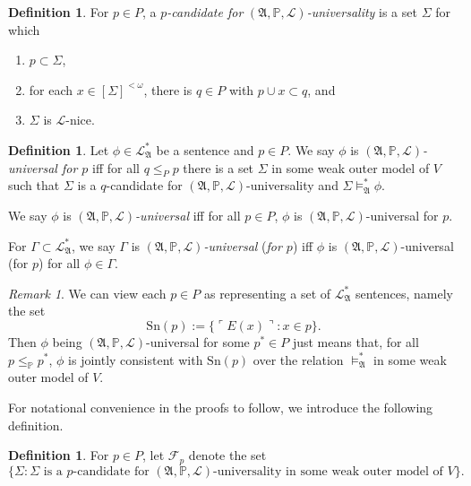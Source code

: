 \documentclass[12pt, twoside]{memoir}
\numberwithin{equation}{section}
\theoremstyle{definition}
\newtheorem{defi}[thm]{Definition}
\theoremstyle{remark}
\newtheorem{rem}[thm]{Remark}
\theoremstyle{definition}
\theoremstyle{definition}
\theoremstyle{definition}
\theoremstyle{remark}
\begin{document}
\begin{defi}
For $p \in P$, a $p$\emph{-candidate for} $(\mathfrak{A}, \mathbb{P}, \mathcal{L})$\emph{-universality} is a set $\Sigma$ for which
\begin{enumerate}[label=(\alph*)]
   \item $p \subset \Sigma$,
   \item for each $x \in [\Sigma]^{<\omega}$, there is $q \in P$ with $p \cup x \subset q$, and 
   \item $\Sigma$ is $\mathcal{L}$-nice.
\end{enumerate}
\end{defi}

\begin{defi}
Let $\phi \in \mathcal{L}^{*}_{\mathfrak{A}}$ be a sentence and $p \in P$. We say $\phi$ is $(\mathfrak{A}, \mathbb{P}, \mathcal{L})$\emph{-universal for $p$} iff for all $q \leq_P p$ there is a set $\Sigma$ in some weak outer model of $V$ such that $\Sigma$ is a $q$-candidate for $(\mathfrak{A}, \mathbb{P}, \mathcal{L})$-universality and $\Sigma \models^*_{\mathfrak{A}} \phi$.

We say $\phi$ is $(\mathfrak{A}, \mathbb{P}, \mathcal{L})$\emph{-universal} iff for all $p \in P$, $\phi$ is $(\mathfrak{A}, \mathbb{P}, \mathcal{L})$-universal for $p$. 

For $\Gamma \subset \mathcal{L}^{*}_{\mathfrak{A}}$, we say $\Gamma$ is $(\mathfrak{A}, \mathbb{P}, \mathcal{L})$\emph{-universal} (\emph{for $p$}) iff $\phi$ is $(\mathfrak{A}, \mathbb{P}, \mathcal{L})$-universal (for $p$) for all $\phi \in \Gamma$.
\end{defi}

\begin{rem}\label{rem341}
We can view each $p \in P$ as representing a set of $\mathcal{L}^{*}_{\mathfrak{A}}$ sentences, namely the set
\begin{equation*}
    \mathrm{Sn}(p) := \{\ulcorner E(x) \urcorner : x \in p\} \text{.}
\end{equation*}
Then $\phi$ being $(\mathfrak{A}, \mathbb{P}, \mathcal{L})$-universal for some $p^* \in P$ just means that, for all $p \leq_{\mathbb{P}} p^*$, $\phi$ is jointly consistent with $\mathrm{Sn}(p)$ over the relation $\models^{*}_{\mathfrak{A}}$ in some weak outer model of $V$.
\end{rem}

For notational convenience in the proofs to follow, we introduce the following definition.

\begin{defi}
For $p \in P$, let $\mathcal{F}_p$ denote the set 
\begin{equation*}
    \{\Sigma : \Sigma \text{ is a } p \text{-candidate for } (\mathfrak{A}, \mathbb{P}, \mathcal{L}) \text{-universality in some weak outer model of } V\}.
\end{equation*}
\end{defi}
\end{document}
